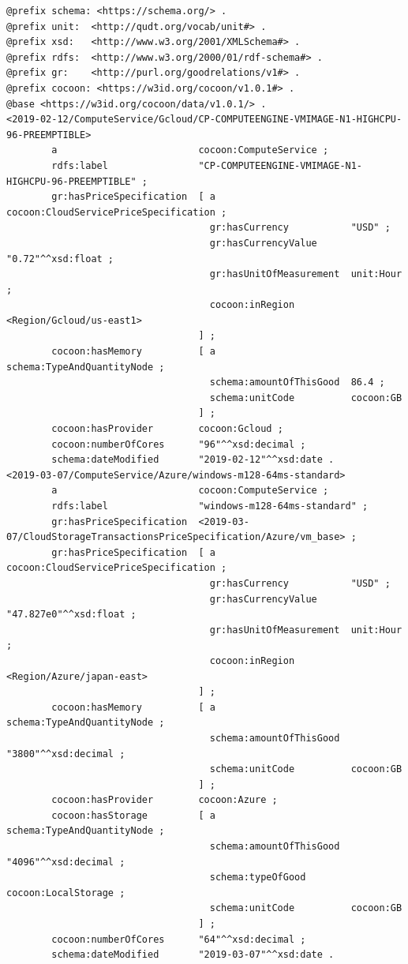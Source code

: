 \begin{lstlisting}[caption={Virtual Machine},label={lst:VM}]
@prefix schema: <https://schema.org/> .
@prefix unit:  <http://qudt.org/vocab/unit#> .
@prefix xsd:   <http://www.w3.org/2001/XMLSchema#> .
@prefix rdfs:  <http://www.w3.org/2000/01/rdf-schema#> .
@prefix gr:    <http://purl.org/goodrelations/v1#> .
@prefix cocoon: <https://w3id.org/cocoon/v1.0.1#> .
@base <https://w3id.org/cocoon/data/v1.0.1/> .
<2019-02-12/ComputeService/Gcloud/CP-COMPUTEENGINE-VMIMAGE-N1-HIGHCPU-96-PREEMPTIBLE>
        a                         cocoon:ComputeService ;
        rdfs:label                "CP-COMPUTEENGINE-VMIMAGE-N1-HIGHCPU-96-PREEMPTIBLE" ;
        gr:hasPriceSpecification  [ a                        cocoon:CloudServicePriceSpecification ;
                                    gr:hasCurrency           "USD" ;
                                    gr:hasCurrencyValue      "0.72"^^xsd:float ;
                                    gr:hasUnitOfMeasurement  unit:Hour ;
                                    cocoon:inRegion         <Region/Gcloud/us-east1>
                                  ] ;
        cocoon:hasMemory          [ a                        schema:TypeAndQuantityNode ;
                                    schema:amountOfThisGood  86.4 ;
                                    schema:unitCode          cocoon:GB
                                  ] ;
        cocoon:hasProvider        cocoon:Gcloud ;
        cocoon:numberOfCores      "96"^^xsd:decimal ;
        schema:dateModified       "2019-02-12"^^xsd:date .
<2019-03-07/ComputeService/Azure/windows-m128-64ms-standard>
        a                         cocoon:ComputeService ;
        rdfs:label                "windows-m128-64ms-standard" ;
        gr:hasPriceSpecification  <2019-03-07/CloudStorageTransactionsPriceSpecification/Azure/vm_base> ;
        gr:hasPriceSpecification  [ a                        cocoon:CloudServicePriceSpecification ;
                                    gr:hasCurrency           "USD" ;
                                    gr:hasCurrencyValue      "47.827e0"^^xsd:float ;
                                    gr:hasUnitOfMeasurement  unit:Hour ;
                                    cocoon:inRegion         <Region/Azure/japan-east>
                                  ] ;
        cocoon:hasMemory          [ a                        schema:TypeAndQuantityNode ;
                                    schema:amountOfThisGood  "3800"^^xsd:decimal ;
                                    schema:unitCode          cocoon:GB
                                  ] ;
        cocoon:hasProvider        cocoon:Azure ;
        cocoon:hasStorage         [ a                        schema:TypeAndQuantityNode ;
                                    schema:amountOfThisGood  "4096"^^xsd:decimal ;
                                    schema:typeOfGood        cocoon:LocalStorage ;
                                    schema:unitCode          cocoon:GB
                                  ] ;
        cocoon:numberOfCores      "64"^^xsd:decimal ;
        schema:dateModified       "2019-03-07"^^xsd:date .
\end{lstlisting}

